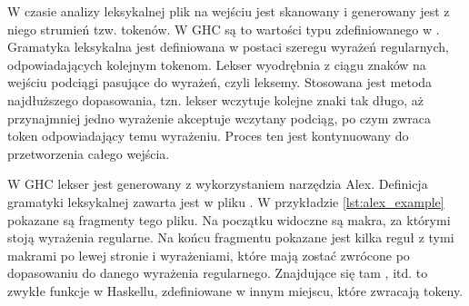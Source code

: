 W czasie analizy leksykalnej plik na wejściu jest skanowany i generowany jest
z niego strumień tzw. tokenów. W GHC są to wartości typu 
zdefiniowanego w . Gramatyka leksykalna jest definiowana
w postaci szeregu wyrażeń regularnych, odpowiadających kolejnym tokenom.
Lekser wyodrębnia z ciągu znaków na wejściu podciągi pasujące do wyrażeń,
czyli leksemy. Stosowana jest metoda najdłuższego dopasowania, tzn. lekser
wczytuje kolejne znaki tak długo, aż przynajmniej jedno wyrażenie akceptuje
wczytany podciąg, po czym zwraca token odpowiadający temu wyrażeniu.
Proces ten jest kontynuowany do przetworzenia całego wejścia.

W GHC lekser jest generowany z wykorzystaniem narzędzia Alex. Definicja
gramatyki leksykalnej zawarta jest w pliku . W przykładzie
\ref{lst:alex_example} pokazane są fragmenty tego pliku. Na początku widoczne są
makra, za którymi stoją wyrażenia regularne. Na końcu fragmentu pokazane jest
kilka reguł z tymi makrami po lewej stronie i wyrażeniami, które mają zostać
zwrócone po dopasowaniu do danego wyrażenia regularnego. Znajdujące się tam
,  itd. to zwykłe funkcje w Haskellu, zdefiniowane w
innym miejscu, które zwracają tokeny\cite{DocsAlex}.

